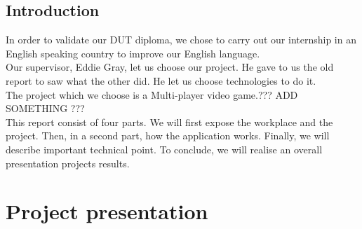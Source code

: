 \documentclass{scrreprt}
\begin{document}
		  \chapter*{Introduction} %
		  In order to validate our DUT diploma, we chose to carry out our internship in an
		  English speaking country to improve our English language.\\


		  Our supervisor, Eddie Gray, let us choose our project. He gave to us the old report to saw what the other did. He let us choose technologies to do it.\\

		  The project which we choose is a Multi-player video game.??? ADD SOMETHING ???\\


		  This report consist of four parts. We will first expose the workplace and the project. Then, in a second part, how the application works. Finally, we will describe important technical point.
		  To conclude, we will realise an overall presentation projects results.\\
	

		  \renewcommand{\contentsname}{Summary}
		  \tableofcontents

		  \part{Project presentation}
\end{document}
